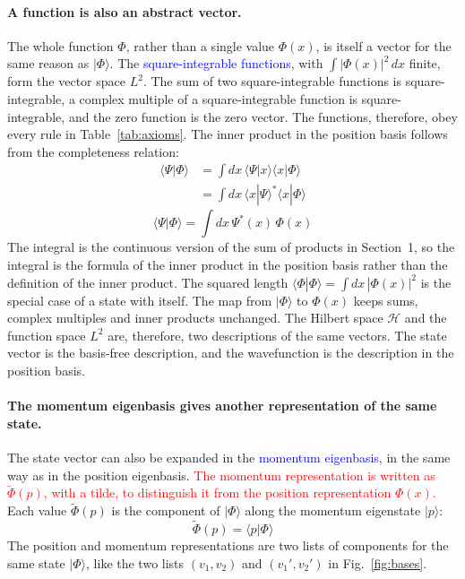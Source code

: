 \paragraph{A function is also an abstract vector.} The whole function $\Phi$, rather than a single value $\Phi(x)$, is itself a vector for the same reason as $|\Phi\rangle$. The \textcolor{blue}{square-integrable functions}, with $\int |\Phi(x)|^2\, dx$ finite, form the vector space $L^2$. The sum of two square-integrable functions is square-integrable, a complex multiple of a square-integrable function is square-integrable, and the zero function is the zero vector. The functions, therefore, obey every rule in Table~\ref{tab:axioms}. The inner product in the position basis follows from the completeness relation:
\begin{align*}
    \langle \Psi | \Phi \rangle &= \int dx\, \langle \Psi | x \rangle \langle x | \Phi \rangle \\
    &= \int dx\, \langle x | \Psi \rangle^* \langle x | \Phi \rangle
\end{align*}
\begin{equation}
    \boxed{\langle \Psi | \Phi \rangle = \int dx\, \Psi^*(x)\, \Phi(x)}
\end{equation}
The integral is the continuous version of the sum of products in Section~1, so the integral is the formula of the inner product in the position basis rather than the definition of the inner product. The squared length $\langle \Phi | \Phi \rangle = \int dx\, |\Phi(x)|^2$ is the special case of a state with itself. The map from $|\Phi\rangle$ to $\Phi(x)$ keeps sums, complex multiples and inner products unchanged. The Hilbert space $\mathcal{H}$ and the function space $L^2$ are, therefore, two descriptions of the same vectors. The state vector is the basis-free description, and the wavefunction is the description in the position basis.

\paragraph{The momentum eigenbasis gives another representation of the same state.} The state vector can also be expanded in the \textcolor{blue}{momentum eigenbasis}, in the same way as in the position eigenbasis. \textcolor{red}{The momentum representation is written as $\tilde{\Phi}(p)$, with a tilde, to distinguish it from the position representation $\Phi(x)$.} Each value $\tilde{\Phi}(p)$ is the component of $|\Phi\rangle$ along the momentum eigenstate $|p\rangle$:
\begin{equation}
    \boxed{\tilde{\Phi}(p) = \langle p | \Phi \rangle}
\end{equation}
The position and momentum representations are two lists of components for the same state $|\Phi\rangle$, like the two lists $(v_1, v_2)$ and $(v_1', v_2')$ in Fig.~\ref{fig:bases}.

